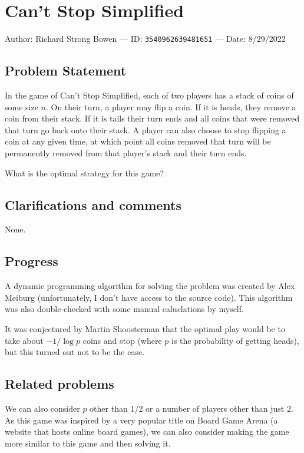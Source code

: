 
\section{Can't Stop Simplified}

Author: Richard Strong Bowen --- ID: \verb`3540962639481651` --- Date: 8/29/2022

\subsection{Problem Statement}

In the game of Can't Stop Simplified, each of two players has a stack of coins of some size $n$. On their turn, a player may flip a coin. If it is heads, they remove a coin from their stack. If it is tails their turn ends and all coins that were removed that turn go back onto their stack. A player can also choose to stop flipping a coin at any given time, at which point all coins removed that turn will be permanently removed from that player's stack and their turn ends.

What is the optimal strategy for this game?

\subsection{Clarifications and comments}

None.

\subsection{Progress}

A dynamic programming algorithm for solving the problem was created by Alex Meiburg (unfortunately, I don't have access to the source code). This algorithm was also double-checked with some manual caluclations by myself.

It was conjectured by Martin Shoosterman that the optimal play would be to take about $-1/\log p$ coins and stop (where $p$ is the probability of getting heads), but this turned out not to be the case.

\subsection{Related problems}

We can also consider $p$ other than 1/2 or a number of players other than just 2. As this game was inspired by a very popular title on Board Game Arena (a website that hosts online board games), we can also consider making the game more similar to this game and then solving it.

